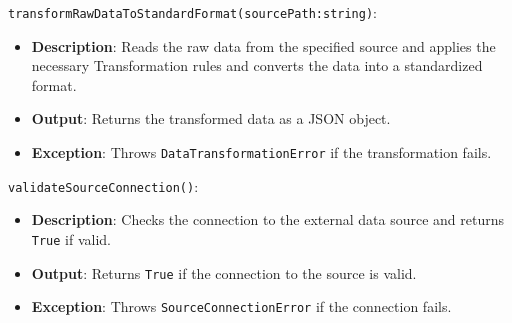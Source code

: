 \documentclass[12pt, titlepage]{article}
\begin{document}
\begin{description}
  \item[Local Function:] 
  \item
  \texttt{transformRawDataToStandardFormat(sourcePath:string)}:
  \item
  \begin{itemize}
    \item \textbf{Description}: Reads the raw data from the specified source and applies the necessary Transformation
    rules and converts the data into a standardized format.
  \end{itemize}
  \item 
  \begin{itemize}
    \item \textbf{Output}: Returns the transformed data as a JSON object.
  \end{itemize}
  \item
  \begin{itemize}
    \item \textbf{Exception}: Throws \texttt{DataTransformationError} if the
    transformation fails.
  \end{itemize}
  \item 

  \texttt{validateSourceConnection()}:
  \item 
  \begin{itemize}
    \item \textbf{Description}: Checks the connection to the external data source and returns \texttt{True} if valid.
  \end{itemize}
  \item 
  \begin{itemize}
    \item \textbf{Output}: Returns \texttt{True} if the connection to the source is valid.
  \end{itemize}
  \item
  \begin{itemize}
    \item \textbf{Exception}: Throws \texttt{SourceConnectionError} if the
    connection fails.
  \end{itemize}
\end{description}
\end{document}
